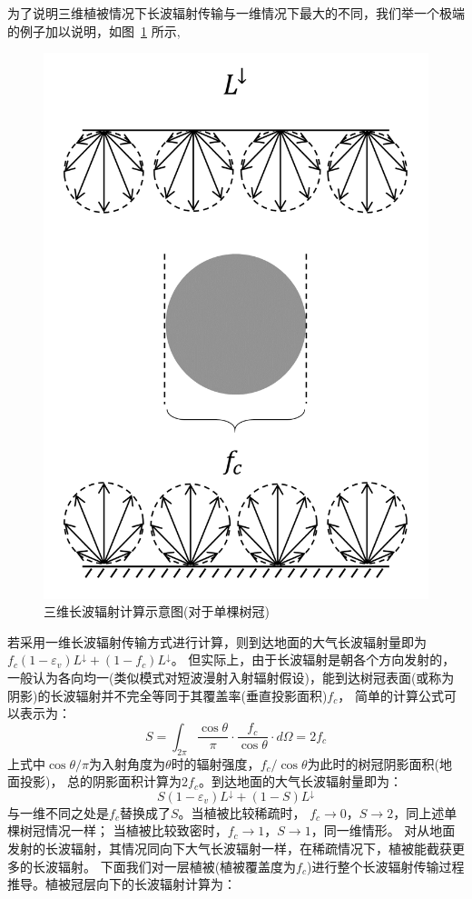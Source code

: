 为了说明三维植被情况下长波辐射传输与一维情况下最大的不同，我们举一个极端的例子加以说明，如图~\ref{fig:单棵树冠长波辐射传输示意图} 所示,
{
\begin{figure}[]
\centering
\includegraphics[width=0.5\columnwidth]{Figures/辐射过程及辐射通量计算/单棵树冠长波辐射传输示意图.png}
\caption{三维长波辐射计算示意图(对于单棵树冠)}
\label{fig:单棵树冠长波辐射传输示意图}
\end{figure}
}
%
若采用一维长波辐射传输方式进行计算，则到达地面的大气长波辐射量即为$f_c\left(1-\varepsilon_v\right)L^\downarrow+\left(1-f_c\right)L^\downarrow$。
但实际上，由于长波辐射是朝各个方向发射的，一般认为各向均一(类似模式对短波漫射入射辐射假设)，能到达树冠表面(或称为阴影)的长波辐射并不完全等同于其覆盖率(垂直投影面积)$f_c$，
简单的计算公式可以表示为：
\begin{equation}
S=\int_{2 \pi} \frac{\cos \theta}{\pi} \cdot \frac{f_{c}}{\cos \theta} \cdot d \Omega=2 f_{c}
\end{equation}
上式中$\cos{\theta}/\pi$为入射角度为$\theta$时的辐射强度，$f_c/\cos{\theta}$为此时的树冠阴影面积(地面投影)，
总的阴影面积计算为$2f_c$。到达地面的大气长波辐射量即为：
\begin{equation}
S\left(1-\varepsilon_{v}\right) L ^\downarrow+(1-S) L ^\downarrow
\end{equation}
与一维不同之处是$f_c$替换成了$S$。当植被比较稀疏时，
$f_c\rightarrow0$，$S\rightarrow2$，同上述单棵树冠情况一样；
当植被比较致密时，$f_c\rightarrow1$，$S\rightarrow1$，同一维情形。
对从地面发射的长波辐射，其情况同向下大气长波辐射一样，在稀疏情况下，植被能截获更多的长波辐射。
下面我们对一层植被(植被覆盖度为$f_c$)进行整个长波辐射传输过程推导。植被冠层向下的长波辐射计算为：
